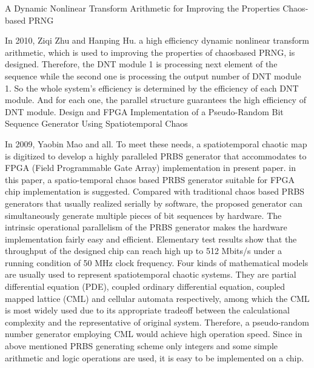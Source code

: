 A Dynamic Nonlinear Transform Arithmetic for Improving the Properties Chaos-based PRNG

In 2010, Ziqi Zhu and Hanping Hu. a high efficiency dynamic nonlinear transform arithmetic, which is used to improving the properties of chaosbased PRNG, is designed. Therefore, the DNT module 1 is processing next element of the sequence while the second one is processing the output number of DNT module 1. So the whole system's efficiency is determined by the efficiency of each DNT module. And for each one, the parallel structure guarantees the high efficiency of DNT module.
Design and FPGA Implementation of a Pseudo-Random Bit Sequence Generator Using Spatiotemporal Chaos

In 2009, Yaobin Mao and all. To meet these needs, a spatiotemporal chaotic map is digitized to develop a highly paralleled PRBS generator that accommodates to FPGA (Field Programmable Gate Array) implementation in present paper. in this paper, a spatio-temporal chaos based PRBS generator suitable for FPGA chip implementation is suggested. Compared with traditional chaos based PRBS generators that usually realized serially by software, the proposed generator can simultaneously generate multiple pieces of bit sequences by hardware. The intrinsic operational parallelism of the PRBS generator makes the hardware implementation fairly easy and efficient. Elementary test results show that the throughput of the designed chip can reach high up to 512 Mbits/s under a running condition of 50 MHz clock frequency. Four kinds of mathematical models are usually used to represent spatiotemporal chaotic systems. They are partial differential equation (PDE), coupled ordinary differential equation, coupled mapped lattice (CML) and cellular automata respectively, among which the CML is most widely used due to its appropriate tradeoff between the calculational complexity and the representative of original system. Therefore, a pseudo-random number generator employing CML would achieve high operation speed. Since in above mentioned PRBS generating scheme only integers and some simple arithmetic and logic operations are used, it is easy to be implemented on a chip. 
